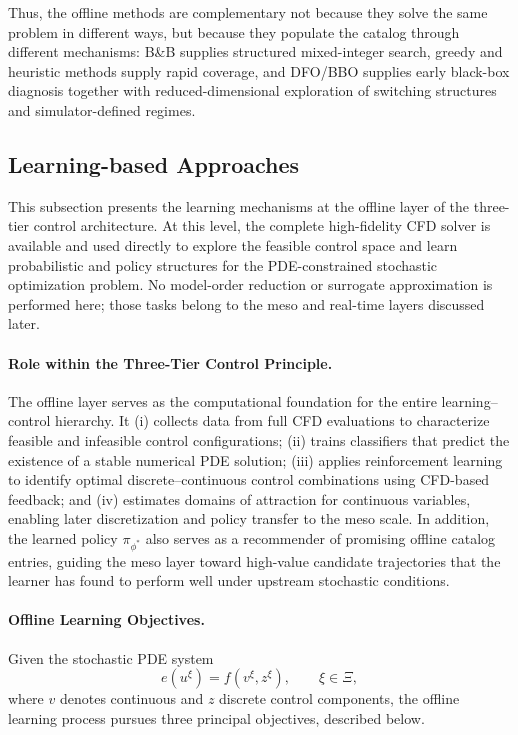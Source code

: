 \documentclass{article}
\newcommand{\1}{\mathds{1}}          %
\theoremstyle{definition}
\begin{document}
\begin{sloppypar}
Thus, the offline methods are complementary not because they solve the same problem in
different ways, but because they populate the catalog through different mechanisms:
B\&B supplies structured mixed-integer search, greedy and heuristic methods supply rapid
coverage, and DFO/BBO supplies early black-box diagnosis together with reduced-dimensional
exploration of switching structures and simulator-defined regimes.

\subsection{Learning-based Approaches}

This subsection presents the learning mechanisms at the offline layer of the three-tier control architecture. At this level, the complete high-fidelity CFD solver is available and used directly to explore the feasible control space and learn probabilistic and policy structures for the PDE-constrained stochastic optimization problem. No model-order reduction or surrogate approximation is performed here; those tasks belong to the meso and real-time layers discussed later.


\paragraph{Role within the Three-Tier Control Principle.}
The offline layer serves as the computational foundation for the entire learning--control hierarchy. It (i) collects data from full CFD evaluations to characterize feasible and infeasible control configurations; (ii) trains classifiers that predict the existence of a stable numerical PDE solution; (iii) applies reinforcement learning to identify optimal discrete--continuous control combinations using CFD-based feedback; and (iv) estimates domains of attraction for continuous variables, enabling later discretization and policy transfer to the meso scale. In addition, the learned policy $\pi_{\phi^*}$ also serves as a recommender of promising offline catalog entries, guiding the meso layer toward high-value candidate trajectories that the learner has found to perform well under upstream stochastic conditions.


\paragraph{Offline Learning Objectives.}
Given the stochastic PDE system
\[
e(u^{\xi}) = f(v^{\xi},z^{\xi}), \qquad \xi \in \Xi,
\]
where $v$ denotes continuous and $z$ discrete control components, the offline learning process
pursues three principal objectives, described below.


\end{sloppypar}
\end{document}
